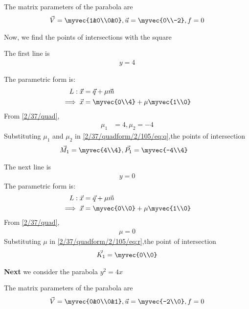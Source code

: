 The matrix parameters of the parabola are
\begin{align}
\vec{V}=\myvec{1&0\\0&0},\vec{u}=\myvec{0\\-2},f=0 \label{2/37/quadform/2/105/eq:v}
\end{align}

Now, we find the points of intersections with the square

The first line is
\begin{align} 
y=4
\end{align}

 The parametric form is:
\begin{align} 
L: \vec{x}&=\vec{q}+\mu\vec{m}
\\
\implies \vec{x}&=\myvec{0\\4}+\mu\myvec{1\\0} \label{2/37/quadform/2/105/eq:q}
\end{align}
From  \eqref{2/37/quad},
\begin{align}
\mu_1 &= 4, \mu_2 =-4
\end{align}
Substituting $\mu_1$ and $\mu_2$ in \eqref{2/37/quadform/2/105/eq:q},the points of intersection
\begin{align}
 \vec{M_1}= \myvec{4\\4},  
\vec{P_1}&= \myvec{-4\\4}
\end{align}

The next line is 
\begin{align} 
y=0
\end{align}
The parametric form is:
\begin{align} 
L: \vec{x}&=\vec{q}+\mu\vec{m}
\\
\implies \vec{x}&=\myvec{0\\0}+\mu\myvec{1\\0} \label{2/37/quadform/2/105/eq:r}
\end{align}
From  \eqref{2/37/quad},
\begin{align}
\mu = 0
\end{align}
Substituting $\mu$ in \eqref{2/37/quadform/2/105/eq:r},the point of intersection
\begin{align}
 \vec{K_1}= \myvec{0\\0}
\end{align}

\textbf{Next} we consider the parabola $y^2 = 4x$

The matrix parameters of the parabola are
\begin{align}
\vec{V}=\myvec{0&0\\0&1},\vec{u}=\myvec{-2\\0},f=0 \label{2/37/quadform/2/105/eq:vi}
\end{align}


